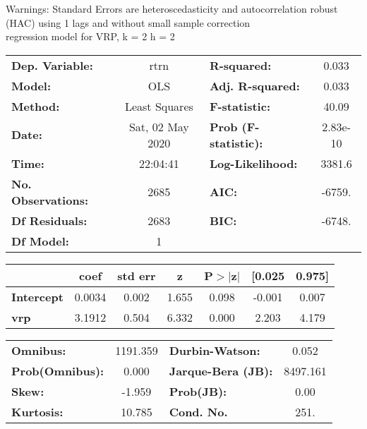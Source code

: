 Warnings: \newline
 [1] Standard Errors are heteroscedasticity and autocorrelation robust (HAC) using 1 lags and without small sample correction\\ 

regression model for VRP, k = 2 h = 2\begin{center}
\begin{tabular}{lclc}
\toprule
\textbf{Dep. Variable:}    &       rtrn       & \textbf{  R-squared:         } &     0.033   \\
\textbf{Model:}            &       OLS        & \textbf{  Adj. R-squared:    } &     0.033   \\
\textbf{Method:}           &  Least Squares   & \textbf{  F-statistic:       } &     40.09   \\
\textbf{Date:}             & Sat, 02 May 2020 & \textbf{  Prob (F-statistic):} &  2.83e-10   \\
\textbf{Time:}             &     22:04:41     & \textbf{  Log-Likelihood:    } &    3381.6   \\
\textbf{No. Observations:} &        2685      & \textbf{  AIC:               } &    -6759.   \\
\textbf{Df Residuals:}     &        2683      & \textbf{  BIC:               } &    -6748.   \\
\textbf{Df Model:}         &           1      & \textbf{                     } &             \\
\bottomrule
\end{tabular}
\begin{tabular}{lcccccc}
                   & \textbf{coef} & \textbf{std err} & \textbf{z} & \textbf{P$> |$z$|$} & \textbf{[0.025} & \textbf{0.975]}  \\
\midrule
\textbf{Intercept} &       0.0034  &        0.002     &     1.655  &         0.098        &       -0.001    &        0.007     \\
\textbf{vrp}       &       3.1912  &        0.504     &     6.332  &         0.000        &        2.203    &        4.179     \\
\bottomrule
\end{tabular}
\begin{tabular}{lclc}
\textbf{Omnibus:}       & 1191.359 & \textbf{  Durbin-Watson:     } &    0.052  \\
\textbf{Prob(Omnibus):} &   0.000  & \textbf{  Jarque-Bera (JB):  } & 8497.161  \\
\textbf{Skew:}          &  -1.959  & \textbf{  Prob(JB):          } &     0.00  \\
\textbf{Kurtosis:}      &  10.785  & \textbf{  Cond. No.          } &     251.  \\
\bottomrule
\end{tabular}
\end{center}

